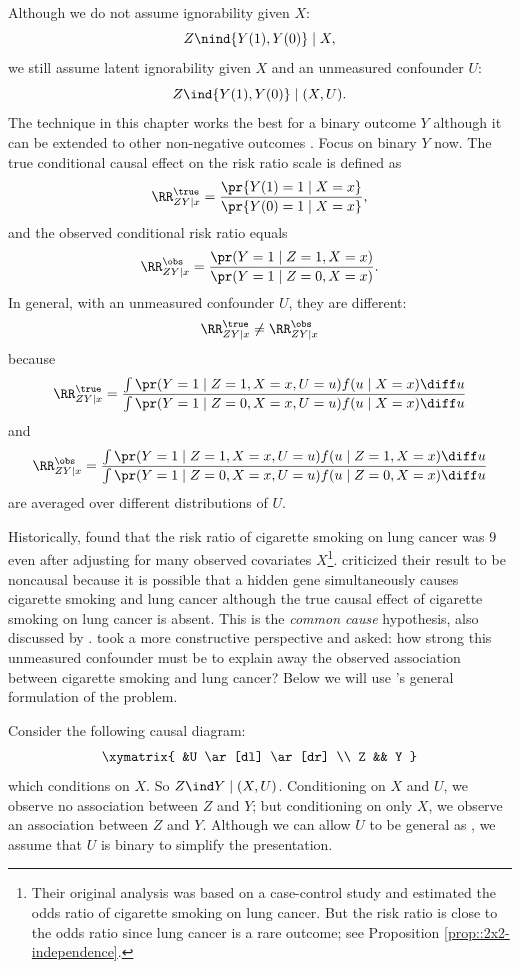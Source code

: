 Although we do not assume ignorability given $X$:
$$
Z\nind \{  Y(1), Y(0) \} \mid X ,
$$
we still assume latent ignorability given $X$ and an unmeasured confounder $U$: 
$$
Z\ind \{  Y(1), Y(0) \} \mid (X, U) . 
$$
The technique in this chapter works the best for a binary outcome $Y$ although it can be extended to other non-negative outcomes \citep{ding2016sensitivity}. Focus on binary $Y$ now. The true conditional causal effect on the risk ratio scale is defined as 
$$
\RR_{ZY\mid x}^\true = \frac{  \pr\{ Y(1) = 1\mid X=x  \} }{ \pr\{ Y(0) = 1\mid X=x  \} },
$$
and the observed conditional risk ratio equals 
$$
\RR_{ZY\mid x}^\obs = \frac{  \pr( Y  = 1\mid Z=1, X=x  ) }{ \pr( Y  = 1\mid  Z=0, X=x  ) }.
$$
In general, with an unmeasured confounder $U$,  they are different:
$$
\RR_{ZY\mid x}^\true  \neq \RR_{ZY\mid x}^\obs 
$$ 
because
$$
\RR_{ZY\mid x}^\true = \frac{  \int  \pr( Y = 1\mid Z=1, X=x, U=u  )  f(u \mid X=x) \diff u }
{ \int \pr( Y = 1\mid Z=0,  X=x , U=u  )  f(u \mid X=x) \diff u }
$$
and
$$
\RR_{ZY\mid x}^\obs = \frac{ \int   \pr( Y  = 1\mid Z=1, X=x , U=u ) f(u \mid Z=1, X=x) \diff u   }
{ \int  \pr( Y  = 1\mid  Z=0, X=x, U=u  ) f(u \mid Z=0, X=x) \diff u  } 
$$
are averaged over different distributions of $U$. 


Historically,  \citet{doll1950smoking} found that the risk ratio of cigarette smoking on lung cancer was $9$ even after adjusting for many observed covariates $X$\footnote{Their original analysis was based on a case-control study and estimated the odds ratio of cigarette smoking on lung cancer. But the risk ratio is close to the odds ratio since lung cancer is a rare outcome; see Proposition \ref{prop::2x2-independence}.}. \citet{Fisher::1957} criticized their result to be noncausal because it is possible that a hidden gene simultaneously causes cigarette smoking and lung cancer although the true causal effect of cigarette smoking on lung cancer is absent. This is the {\it common cause} hypothesis, also discussed by \citet{reichenbach1991direction}. \citet{Cornfield::1959} took a more constructive perspective and asked: how strong this unmeasured confounder must be to explain away the observed association between cigarette smoking and lung cancer? Below we will use  \citet{ding2016sensitivity}'s general formulation of the problem. 


Consider the following causal diagram:
$$
\xymatrix{
 &U \ar[dl] \ar[dr] \\
 Z   && Y 
}
$$
which conditions on $X$. So $Z\ind Y\mid (X, U)$. Conditioning on $X$ and $U$, we observe no association between $Z$ and $Y$; but conditioning on only $X$, we observe an association between $Z$ and $Y$.  Although we can allow $U$ to be general as \citet{ding2016sensitivity}, we assume that $U$ is binary to simplify the presentation. 


